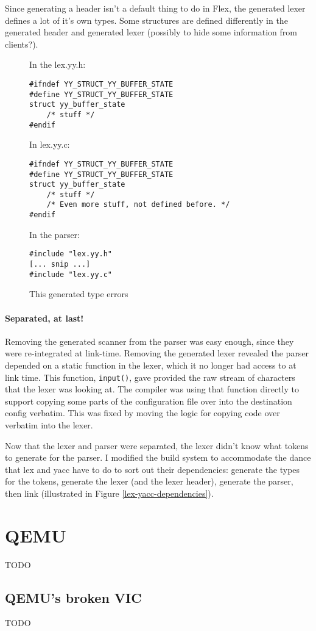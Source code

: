\documentclass[12pt]{article}
\newcommand{\TODO}[1]{{\huge\color{red}TODO \Large #1}}
\newcommand{\code}[1]{{\tt #1}}
\begin{document}
Since generating a header isn't a default thing to do in Flex, the generated
lexer defines a lot of it's own types. Some structures are defined differently
in the generated header and generated lexer (possibly to hide some information
from clients?).

\begin{figure}
\label{include-c-h}\caption{This generated type errors}
In the lex.yy.h:
\begin{verbatim}
#ifndef YY_STRUCT_YY_BUFFER_STATE
#define YY_STRUCT_YY_BUFFER_STATE
struct yy_buffer_state
    /* stuff */
#endif
\end{verbatim}

In lex.yy.c:
\begin{verbatim}
#ifndef YY_STRUCT_YY_BUFFER_STATE
#define YY_STRUCT_YY_BUFFER_STATE
struct yy_buffer_state
    /* stuff */
    /* Even more stuff, not defined before. */
#endif
\end{verbatim}

In the parser:
\begin{verbatim}
#include "lex.yy.h"
[... snip ...]
#include "lex.yy.c"
\end{verbatim}
\end{figure}

\paragraph{Separated, at last!}
Removing the generated scanner from the parser was easy enough, since they were
re-integrated at link-time. Removing the generated lexer revealed the 
parser depended on a static function in the lexer, which it no longer had
access to at link time. This function, \code{input()}, gave provided the raw
stream of characters that the lexer was looking at. The compiler was using that
function directly to support copying some parts of the configuration file over
into the destination config verbatim. This was fixed by moving the logic for
copying code over verbatim into the lexer.

Now that the lexer and parser were separated, the lexer didn't know what tokens
to generate for the parser. I modified the build system to accommodate the dance
that lex and yacc have to do to sort out their dependencies: generate the types
for the tokens, generate the lexer (and the lexer header), generate the parser,
then link (illustrated in Figure \ref{lex-yacc-dependencies}).

\section{QEMU}

\TODO{}

\subsection{QEMU's broken VIC}

\TODO{}
\end{document}
